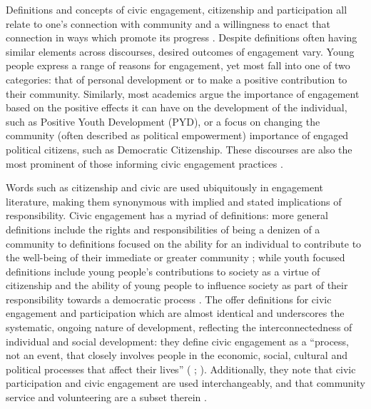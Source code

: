 Definitions and concepts of civic engagement, citizenship and participation all relate to one’s connection with community and a willingness to enact that connection in ways which promote its progress \citep{Lerner2007}. Despite definitions often having similar elements across discourses, desired outcomes of engagement vary. Young people express a range of reasons for engagement, yet most fall into one of two categories: that of personal development or to make a positive contribution to their community. Similarly, most academics argue the importance of engagement based on the positive effects it can have on the development of the individual, such as Positive Youth Development (PYD), or a focus on changing the community (often described as political empowerment) importance of engaged political citizens, such as Democratic Citizenship. These discourses are also the most prominent of those informing civic engagement practices \citep{Shaw2014,Jennings2006}. 

Words such as citizenship and civic are used ubiquitously in engagement literature, making them synonymous with implied and stated implications of responsibility. Civic engagement has a myriad of definitions: more general definitions include the rights and responsibilities of being a denizen of a community \citep{Zaff2010} to definitions focused on the ability for an individual to contribute to the well-being of their immediate or greater community ; while youth focused definitions include young people's contributions to society as a virtue of citizenship \citep{Lister2007} and the ability of young people to influence society as part of their responsibility towards a democratic process \citep{Camino2002}. The   offer definitions for civic engagement and participation which are almost identical and underscores the systematic, ongoing nature of development, reflecting the interconnectedness of individual and social development: they define civic engagement as a “process, not an event, that closely involves people in the economic, social, cultural and political processes that affect their lives” ( \citeyear[][p1]{UNDP2002}; ). Additionally, they note that civic participation and civic engagement are used interchangeably, and that community service and volunteering are a subset therein . 

